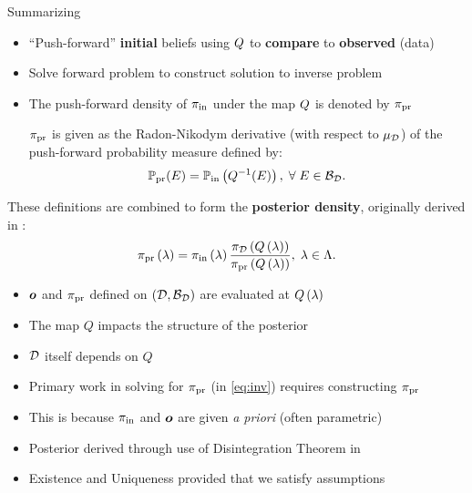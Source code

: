\begin{frame}[t]{Summarizing}
\begin{itemize}
	\item ``Push-forward'' \textbf{initial} beliefs using $Q$ to \textbf{compare} to \textbf{observed} (data)
	\item Solve forward problem to construct solution to inverse problem
	\item The push-forward density of $\operatorname*{\pi_{in}}$ under the map $Q$ is denoted by $\operatorname*{\pi_{pr}}$

	\begin{defn}\label{defn:predicted}
		$\operatorname*{\pi_{pr}}$ is given as the Radon-Nikodym derivative (with respect to $\mu_{\mathcal{D}}$) of the push-forward probability measure defined by:
		\begin{equation}\label{eq:pred}
			\operatorname*{\mathbb{P}_{pr}} (E)  = \operatorname*{\mathbb{P}_{in}} \left ( Q^{-1}(E) \right ), \; \forall \; E \in \mathcal{B}_{\mathcal{D}}.
		\end{equation}
	\end{defn}

\end{itemize}

\end{frame}

\begin{frame}[t]
These definitions are combined to form the \textbf{posterior density}, originally derived in \cite{BJW18}:
\begin{equation}\label{eq:post}
\operatorname*{\pi_{pr}} \left ( \lambda \right ) = \operatorname*{\pi_{in}} \left ( \lambda \right ) \frac{\pi_{\mathcal{D}} \left ( Q\left ( \lambda \right ) \right ) }{\operatorname*{\pi_{pr}} \left ( Q\left ( \lambda \right ) \right ) }, \; \lambda \in {\Lambda}.
\end{equation}

\begin{itemize}
	\item $\operatorname*{\boldsymbol{o}}$ and $\operatorname*{\pi_{pr}}$ defined on $(\mathcal{D}, \mathcal{B}_{\mathcal{D}})$ are evaluated at $Q\left ( \lambda \right )$
	\item The map $Q$ impacts the structure of the posterior
	\item $\mathcal{D}$ itself depends on $Q$
	\item Primary work in solving for $\operatorname*{\pi_{pr}}$ (in \eqref{eq:inv}) requires constructing $\operatorname*{\pi_{pr}}$
	\item This is because $\operatorname*{\pi_{in}}$ and $\operatorname*{\boldsymbol{o}}$ are given \emph{a priori} (often parametric)
	\item Posterior derived through use of Disintegration Theorem in \cite{BJW18}
	\item Existence and Uniqueness provided that we satisfy assumptions
\end{itemize}
\end{frame}




